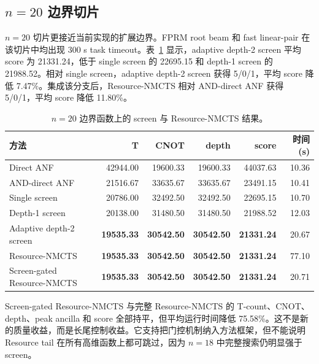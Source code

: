 \documentclass[UTF8,fontset=macnew,11pt]{ctexart}
\newcommand{\method}{Resource-NMCTS}
\begin{document}
\subsection{\texorpdfstring{$n=20$}{n=20} 边界切片}

$n=20$ 切片更接近当前实现的扩展边界。FPRM root beam 和 fast linear-pair 在该切片中均出现 300 s task timeout。表~\ref{tab:n20} 显示，adaptive depth-2 screen 平均 score 为 21331.24，低于 single screen 的 22695.15 和 depth-1 screen 的 21988.52。相对 single screen，adaptive depth-2 screen 获得 5/0/1，平均 score 降低 7.47\%。集成该分支后，\method{} 相对 AND-direct ANF 获得 5/0/1，平均 score 降低 11.80\%。

\begin{table}[t]
\centering
\scriptsize
\caption{$n=20$ 边界函数上的 screen 与 \method{} 结果。}
\label{tab:n20}
\begin{tabularx}{\linewidth}{>{\raggedright\arraybackslash}Xrrrrr}
\toprule
方法 & T & CNOT & depth & score & 时间(s) \\
\midrule
Direct ANF & 42944.00 & 19600.33 & 19600.33 & 44037.63 & 10.36 \\
AND-direct ANF & 21516.67 & 33635.67 & 33635.67 & 23491.15 & 10.41 \\
Single screen & 20786.00 & 32492.50 & 32492.50 & 22695.15 & 10.70 \\
Depth-1 screen & 20138.00 & 31480.50 & 31480.50 & 21988.52 & 12.03 \\
Adaptive depth-2 screen & \textbf{19535.33} & \textbf{30542.50} & \textbf{30542.50} & \textbf{21331.24} & 20.67 \\
\method{} & \textbf{19535.33} & \textbf{30542.50} & \textbf{30542.50} & \textbf{21331.24} & 77.10 \\
Screen-gated \method{} & \textbf{19535.33} & \textbf{30542.50} & \textbf{30542.50} & \textbf{21331.24} & 20.71 \\
\bottomrule
\end{tabularx}
\end{table}

Screen-gated \method{} 与完整 \method{} 的 T-count、CNOT、depth、peak ancilla 和 score 全部持平，但平均运行时间降低 75.58\%。这不是新的质量收益，而是长尾控制收益。它支持把门控机制纳入方法框架，但不能说明 Resource tail 在所有高维函数上都可跳过，因为 $n=18$ 中完整搜索仍明显强于 screen。
\end{document}
